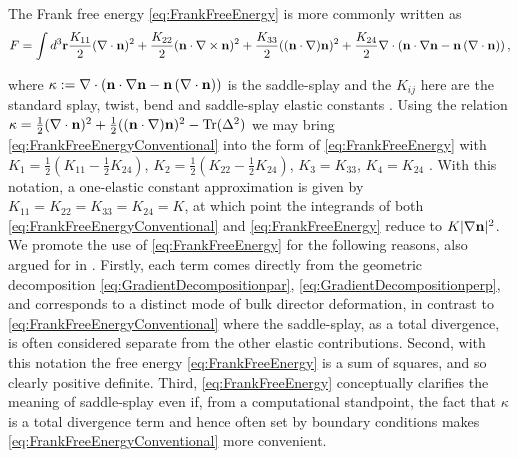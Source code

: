  The Frank free energy \eqref{eq:FrankFreeEnergy} is more commonly written as 
\begin{equation}
  F = \int d^3 {\bf r}\frac{K_{11}}{2} (\nabla \cdot {\bf n})^2 +\frac{K_{22}}{2} ({\bf n} \cdot \nabla \times {\bf n})^2 +\frac{K_{33}}{2}(({\bf n} \cdot \nabla) {\bf n})^2 + \frac{K_{24}}{2} \nabla \cdot \left(  {\bf n}\cdot \nabla {\bf n}-{\bf n}\left(\nabla \cdot {\bf n}\right)\right),
\label{eq:FrankFreeEnergyConventional}
\end{equation}

where $\kappa := \nabla \cdot \left(  {\bf n}\cdot \nabla {\bf n}-{\bf n}\left(\nabla \cdot {\bf n}\right)\right)$ is the saddle-splay and the $K_{ij}$ here are the standard splay, twist, bend and saddle-splay elastic constants \citep{deGennes1992}. Using the relation $\kappa = \frac{1}{2}(\nabla \cdot {\bf n})^2 +\frac{1}{2}(({\bf n} \cdot \nabla) {\bf n})^2-\mathrm{Tr}(\Delta^2)$ we may bring \eqref{eq:FrankFreeEnergyConventional} into the form of \eqref{eq:FrankFreeEnergy} with $K_1 = \frac{1}{2}( K_{11} - \frac{1}{2}K_{24} )$, $K_2 = \frac{1}{2}( K_{22} - \frac{1}{2}K_{24})$, $K_3 = K_{33}$, $K_4=K_{24}$ \citep{Selinger2019}. With this notation, a one-elastic constant approximation is given by $K_{11}=K_{22}=K_{33}=K_{24}=K$, at which point the integrands of both \eqref{eq:FrankFreeEnergyConventional} and \eqref{eq:FrankFreeEnergy} reduce to $K|\nabla {\bf n}|^2$. We promote the use of \eqref{eq:FrankFreeEnergy} for the following reasons, also argued for in \citep{Selinger2019}. Firstly, each term comes directly from the geometric decomposition \eqref{eq:GradientDecompositionpar}, \eqref{eq:GradientDecompositionperp}, and corresponds to a distinct mode of bulk director deformation, in contrast to \eqref{eq:FrankFreeEnergyConventional} where the saddle-splay, as a total divergence, is often considered separate from the other elastic contributions. Second, with this notation the free energy \eqref{eq:FrankFreeEnergy} is a sum of squares, and so clearly positive definite. Third, \eqref{eq:FrankFreeEnergy} conceptually clarifies the meaning of saddle-splay even if, from a computational standpoint, the fact that $\kappa$ is a total divergence term and hence often set by boundary conditions makes \eqref{eq:FrankFreeEnergyConventional} more convenient.

